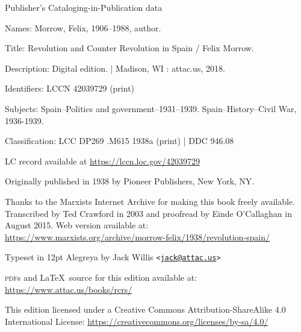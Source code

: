 {
	\setlength{\parindent}{0em}
	\setlength{\parskip}{0.5em}
	\sloppy
	
	\vspace*{\fill}
	
	Publisher’s Cataloging-in-Publication data
	
	\vspace{0.5em}
	
	{\setlength{\parskip}{0em}
		Names: Morrow, Felix, 1906--1988, author.
		
		Title: Revolution and Counter Revolution in Spain / Felix Morrow.
		
		Description: Digital edition. | Madison, WI : 
		attac.us, 2018.
		
		Identifiers: LCCN 42039729 (print)
		
		\hangindent=0.7cm
		Subjects: Spain--Politics and government--1931--1939. Spain--History--Civil War, 1936-1939.
		
		Classification: LCC DP269 .M615 1938a (print) | DDC 946.08
		
		LC record available at \url{https://lccn.loc.gov/42039729}
	}
	
	\vspace*{\fill}
	
	Originally published in 1938 by Pioneer Publishers, New York, NY.
	
	Thanks to the Marxists Internet Archive
	for making this book freely available.
	Transcribed by Ted Crawford in 2003
	and proofread by Einde O’Callaghan in August 2015.
	Web version available at:
	\url{https://www.marxists.org/archive/morrow-felix/1938/revolution-spain/}
	
	Typeset in 12pt Alegreya by Jack Willis
	\texttt{<\href{mailto:jack@attac.us}{jack@attac.us}>}
	
	\textsc{pdf}s and \LaTeX\ source for this edition available at: \url{https://www.attac.us/books/rcrs/}
	
	This edition licensed under a Creative Commons Attribution-Share\-Alike 4.0 International License:
	\url{https://creativecommons.org/licenses/by-sa/4.0/}
}


\newpage
\thispagestyle{empty}
\ \\

\newpage
\thispagestyle{empty}
\ \\